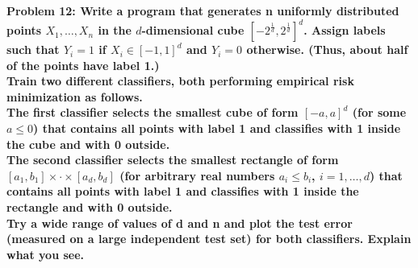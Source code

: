 \documentclass[11pt, english]{article}
\begin{document}
\textbf{Problem 12: Write a program that generates n uniformly distributed points $X_1,\dots,X_n$ in the $d$-dimensional cube $[-2^{\frac{1}{d}},2^{\frac{1}{d}}]^d$. Assign labels such that $Y_i=1$ if $X_i\in[-1,1]^d$ and $Y_i=0$ otherwise. (Thus, about half of the points have label 1.)}\\
\textbf{Train two different classifiers, both performing empirical risk minimization as follows.}\\
\textbf{The first classifier selects the smallest cube of form $[-a,a]^d$ (for some $a\leq0$) that contains all points with label 1 and classifies with 1 inside the cube and with 0 outside.}\\
\textbf{The second classifier selects the smallest rectangle of form$[a_1,b_1]\times\cdot\times[a_d,b_d]$ (for arbitrary real numbers $a_i\leq b_i$, $i=1,\dots,d$) that contains all points with label 1 and classifies with 1 inside the rectangle and with 0 outside.}\\
\textbf{Try a wide range of values of d and n and plot the test error (measured on a large independent test set) for both classifiers. Explain what you see.}
\end{document}
